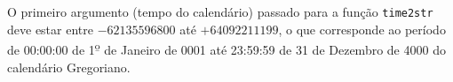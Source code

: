 \documentclass[11pt, brazil]{report}
\begin{document}
O primeiro argumento (tempo do calendário) passado para a função {\tt time2str}
deve estar entre $-62135596800$ até $+64092211199$, o que corresponde ao período
de 00:00:00 de 1{\textsuperscript{\b{o}}} de Janeiro de 0001 até 23:59:59
de 31 de Dezembro de  4000 do calendário Gregoriano.


%
%
%
%
%
%
%
%
%
%
%
%
\end{document}
